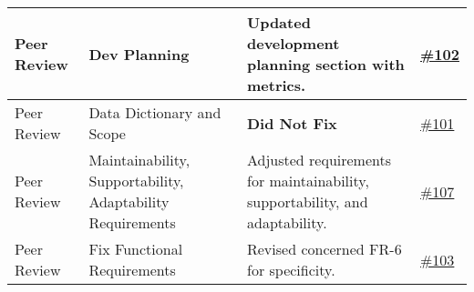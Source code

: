 \documentclass{article}
\begin{document}
\begin{longtable}{| p{} | p{} | p{} | p{} |}
    \hline
    Peer Review & Dev Planning & Updated development planning section with metrics. & \href{https://github.com/TPGEngine/tpg/issues/102}{\#102} \\
    \hline
    Peer Review & Data Dictionary and Scope & \textbf{Did Not Fix} & \href{https://github.com/TPGEngine/tpg/issues/101}{\#101} \\
    \hline
    Peer Review & Maintainability, Supportability, Adaptability Requirements & Adjusted requirements for maintainability, supportability, and adaptability. & \href{https://github.com/TPGEngine/tpg/issues/107}{\#107} \\
    \hline
    Peer Review & Fix Functional Requirements & Revised concerned FR-6 for specificity. & \href{https://github.com/TPGEngine/tpg/issues/103}{\#103} \\
    \hline
\end{longtable}
\end{document}
